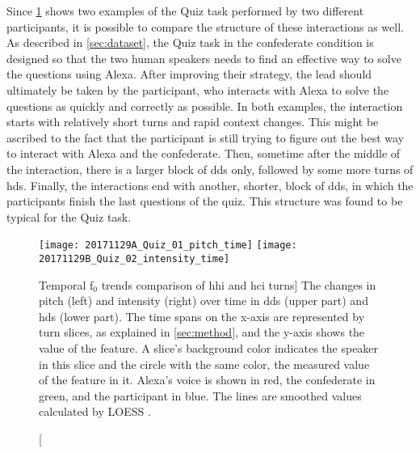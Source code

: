 Since \cref{fig:hds_dds_time_comparisons} shows two examples of the Quiz task performed by two different participants, it is possible to compare the structure of these interactions as well.
As described in \cref{sec:dataset}, the Quiz task in the confederate condition is designed so that the two human speakers needs to find an effective way to solve the questions using Alexa.
After improving their strategy, the lead should ultimately be taken by the participant, who interacts with Alexa to solve the questions as quickly and correctly as possible.
In both examples, the interaction starts with relatively short turns and rapid context changes.
This might be ascribed to the fact that the participant is still trying to figure out the best way to interact with Alexa and the confederate.
Then, sometime after the middle of the interaction, there is a larger block of \ac{dds} only, followed by some more turns of \ac{hds}.
Finally, the interactions end with another, shorter, block of \ac{dds}, in which the participants finish the last questions of the quiz.
This structure was found to be typical for the Quiz task.

\begin{figure}[t]
	\centering
	\subfigure
	{\texttt{[image: 20171129A\_Quiz\_01\_pitch\_time]}
		\label{fig:hds_dds_time_pitch}} 
	\hfill %
	{\texttt{[image: 20171129B\_Quiz\_02\_intensity\_time]}
		\label{fig:hds_dds_time_intensity}}
	\caption
	[Temporal f$_0$ trends comparison of \acs{hhi} and \acs{hci} turns]
	{The changes in pitch (left) and intensity (right) over time in \ac{dds} (upper part) and \ac{hds} (lower part).
		The time spans on the x-axis are represented by turn slices, as explained in \cref{sec:method}, and the y-axis shows the value of the feature.
		A slice's background color indicates the speaker in this slice and the circle with the same color, the measured value of the feature in it.
		Alexa's voice is shown in red, the confederate in green, and the participant in blue.
		The lines are smoothed values calculated by LOESS \citep{Cleveland1988locally}.}
	\label{fig:hds_dds_time_comparisons}
\end{figure}

